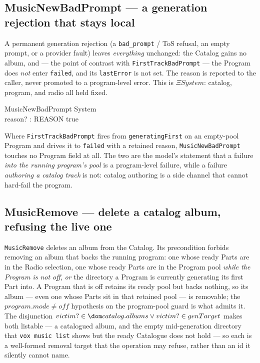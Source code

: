 \documentclass[a4paper,10pt,fleqn]{article}
\begin{document}
\subsection{MusicNewBadPrompt --- a generation rejection that stays local}

A permanent generation rejection (a \texttt{bad\_prompt} / ToS refusal, an empty
prompt, or a provider fault) leaves \emph{everything} unchanged: the Catalog
gains no album, and --- the point of contrast with \texttt{FirstTrackBadPrompt}
--- the Program does \emph{not} enter \texttt{failed}, and its \texttt{lastError}
is not set. The reason is reported to the caller, never promoted to a
program-level error. This is \texttt{$\Xi System$}: catalog, program, and radio
all held fixed.

\begin{schema}{MusicNewBadPrompt}
  \Xi System \\
  reason? : REASON
  \where
  true
\end{schema}

Where \texttt{FirstTrackBadPrompt} fires from \texttt{generatingFirst} on an
empty-pool Program and drives it to \texttt{failed} with a retained reason,
\texttt{MusicNewBadPrompt} touches no Program field at all. The two are the
model's statement that a failure \emph{into the running program's pool} is a
program-level failure, while a failure \emph{authoring a catalog track} is not:
catalog authoring is a side channel that cannot hard-fail the program.

\subsection{MusicRemove --- delete a catalog album, refusing the live one}
\label{sec:removederived}

\texttt{MusicRemove} deletes an album from the Catalog. Its precondition forbids
removing an album that backs the running program: one whose ready Parts are in
the Radio selection, one whose ready Parts are in the Program pool
\emph{while the Program is not off}, \emph{or} the directory a Program is
currently generating its first Part into. A Program that is off retains its
ready pool but backs nothing, so its album --- even one whose Parts sit in that
retained pool --- is removable; the $program.mode \neq off$ hypothesis on the
program-pool guard is what admits it. The disjunction
$victim? \in \dom catalog.albums \lor victim? \in genTarget$ makes both listable
--- a catalogued album, and the empty mid-generation directory that
\texttt{vox music list} shows but the ready Catalogue does not hold --- so each
is a well-formed removal target that the operation may refuse, rather than an id
it silently cannot name.
\end{document}
